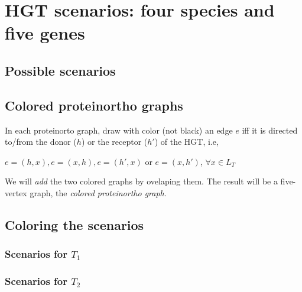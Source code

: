 \documentclass[10pt,a4paper,notitlepage]{article}
\begin{document}
\section{HGT scenarios: four species and five genes}	

\subsection{Possible scenarios}


\subsection{Colored proteinortho graphs}
In each proteinorto graph, draw with color (not black) an edge $e$ iff it is directed to/from the donor ($h$) or the receptor ($h'$) of the HGT, i.e, 
		\begin{center}
			 $e=(h,x),e=(x,h),e=(h',x)$ or $e=(x,h')$, $\forall x\in L_T$\\
		\end{center}

We will \textit{add} the two colored graphs by ovelaping them. The result will be a five-vertex graph, the \textit{colored proteinortho graph}.
\subsection{Coloring the scenarios}
	\subsubsection{Scenarios for $T_1$}
	\subsubsection{Scenarios for $T_2$}		
	
\end{document}
